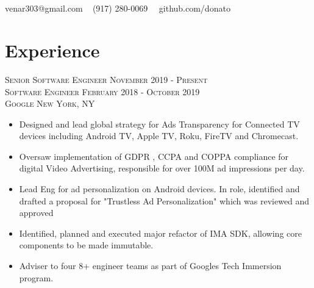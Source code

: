 \documentclass[oneside, final]{scrartcl}
\begin{document}
\begin{center}
 
\textsc{\LARGE{}}\\
\\
{\Large\Letter} venar303@gmail.com \ {\Large\Telefon} (917) 280-0069 \ \faGithub \ github.com/donato

\vspace{-5pt}

\section{Experience}


    \textsc{Senior Software Engineer \hfill November 2019 - Present\\}
    \textsc{Software Engineer \hfill February 2018 - October 2019\\}
    \textsc{Google \hfill New York, NY\\}
    \begin{itemize}
    	\setlength{\itemsep}{1pt}
    	\setlength{\parskip}{0pt}
    	\setlength{\parsep}{0pt}
    	\setlength{\leftmargin}{-5mm}
    	\item Designed and lead global strategy for Ads Transparency for Connected TV devices including Android TV, Apple TV, Roku, FireTV and Chromecast.
    	\item Oversaw implementation of GDPR , CCPA and COPPA compliance for digital Video Advertising, responsible for over 100M ad impressions per day.
    	\item Lead Eng for ad personalization on Android devices. In role, identified and drafted a proposal for "Trustless Ad Personalization" which was reviewed and approved 
    	\item Identified, planned and executed major refactor of IMA SDK, allowing core components to be made immutable.
    	\item Adviser to four 8+ engineer teams as part of Googles Tech Immersion program. 
    \end{itemize}


\end{center}
\end{document}
